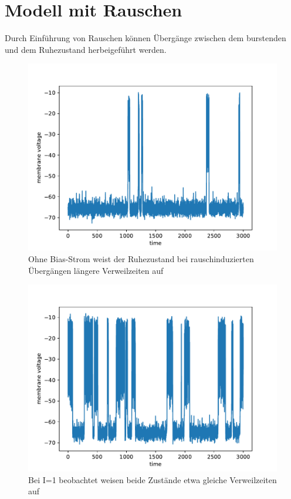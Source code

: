 \documentclass[12pt,a4paper]{article}
\begin{document}
\section{Modell mit Rauschen}
Durch Einführung von Rauschen können Übergänge zwischen dem burstenden und dem Ruhezustand herbeigeführt werden. 
\begin{figure}[H]
	\centering
	\includegraphics[scale=0.9]{inapni0d5.pdf} 
	\caption{Ohne Bias-Strom weist der Ruhezustand bei rauschinduzierten Übergängen längere Verweilzeiten auf}
	\label{i0d5}
\end{figure}
\begin{figure}[H]
	\centering
	\includegraphics[scale=0.9]{inapi1d5.pdf} 
	\caption{Bei I=1 beobachtet weisen beide Zustände etwa gleiche Verweilzeiten auf}
	\label{i1d5}
\end{figure}
\end{document}
